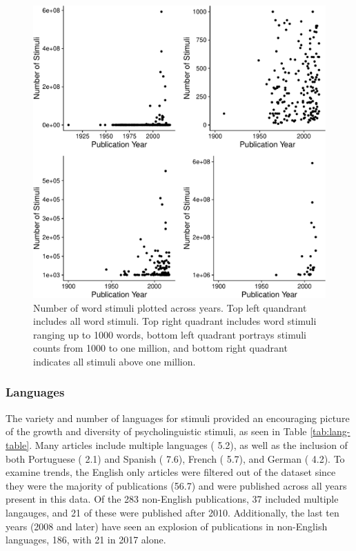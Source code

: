 \documentclass[english,man]{apa6}
\theoremstyle{definition}
\theoremstyle{definition}
\theoremstyle{definition}
\theoremstyle{remark}
\begin{document}
\begin{figure}
\centering
\includegraphics{LAB_files/figure-latex/word-fig-1.pdf}
\caption{\label{fig:word-fig}Number of word stimuli plotted across years.
Top left quandrant includes all word stimuli. Top right quadrant
includes word stimuli ranging up to 1000 words, bottom left quadrant
portrays stimuli counts from 1000 to one million, and bottom right
quadrant indicates all stimuli above one million.}
\end{figure}

\subsubsection{Languages}\label{languages}

The variety and number of languages for stimuli provided an encouraging
picture of the growth and diversity of psycholinguistic stimuli, as seen
in Table \ref{tab:lang-table}. Many articles include multiple languages
( 5.2), as well as the inclusion of both Portuguese ( 2.1) and Spanish (
7.6), French ( 5.7), and German ( 4.2). To examine trends, the English
only articles were filtered out of the dataset since they were the
majority of publications (56.7) and were published across all years
present in this data. Of the 283 non-English publications, 37 included
multiple langauges, and 21 of these were published after 2010.
Additionally, the last ten years (2008 and later) have seen an explosion
of publications in non-English languages, 186, with 21 in 2017 alone.
\end{document}
